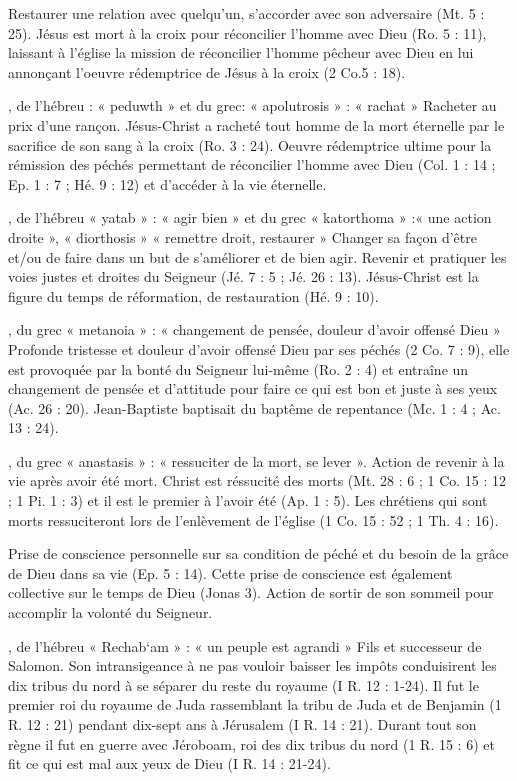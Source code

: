 \begin{multicols}{2}
Restaurer une relation avec quelqu'un, s'accorder avec son adversaire (Mt. 5 : 25). Jésus est mort à la croix pour réconcilier l'homme avec Dieu (Ro. 5 : 11), laissant à l'église la mission de réconcilier l'homme pêcheur avec Dieu en lui annonçant l'oeuvre rédemptrice de Jésus à la croix (2 Co.5 : 18).


, de l'hébreu : « peduwth » et du grec: « apolutrosis » : « rachat »
Racheter au prix d'une rançon. Jésus-Christ a racheté tout homme de la mort éternelle par le sacrifice de son sang à la croix (Ro. 3 : 24). Oeuvre rédemptrice ultime pour la rémission des péchés permettant de réconcilier l'homme avec Dieu (Col. 1 : 14 ; Ep. 1 : 7 ; Hé. 9 : 12) et d'accéder à la vie éternelle.


, de l'hébreu « yatab » : « agir bien » et du grec « katorthoma » :« une action droite », « diorthosis » « remettre droit, restaurer »
Changer sa façon d'être et/ou de faire dans un but de s'améliorer et de bien agir. Revenir et pratiquer les voies justes et droites du Seigneur (Jé. 7 : 5 ; Jé. 26 : 13). Jésus-Christ est la figure du temps de réformation, de restauration (Hé. 9 : 10).


, du grec « metanoia » : « changement de pensée, douleur d'avoir offensé Dieu »
Profonde tristesse et douleur d'avoir offensé Dieu par ses péchés (2 Co. 7 : 9), elle est provoquée par la bonté du Seigneur lui-même (Ro. 2 : 4) et entraîne un changement de pensée et d'attitude pour faire ce qui est bon et juste à ses yeux (Ac. 26 : 20). Jean-Baptiste baptisait du baptême de repentance (Mc. 1 : 4 ; Ac. 13 : 24).


, du grec « anastasis » : « ressuciter de la mort, se lever ».
Action de revenir à la vie après avoir été mort. Christ est réssucité des morts (Mt. 28 : 6 ; 1 Co. 15 : 12 ; 1 Pi. 1 : 3) et il est le premier à l'avoir été (Ap. 1 : 5). Les chrétiens qui sont morts ressuciteront lors de l'enlèvement de l'église (1 Co. 15 : 52 ; 1 Th. 4 : 16).


Prise de conscience personnelle sur sa condition de péché et du besoin de la grâce de Dieu dans sa vie (Ep. 5 : 14). Cette prise de conscience est également collective sur le temps de Dieu (Jonas 3). Action de sortir de son sommeil pour accomplir la volonté du Seigneur.


, de l'hébreu « Rechab`am » : « un peuple est agrandi »
Fils et successeur de Salomon. Son intransigeance à ne pas vouloir baisser les impôts conduisirent les dix tribus du nord à se séparer du reste du royaume (I R. 12 : 1-24). Il fut le premier roi du royaume de Juda rassemblant la tribu de Juda et de Benjamin (1 R. 12 : 21) pendant dix-sept ans à Jérusalem (I R. 14 : 21). Durant tout son règne il fut en guerre avec Jéroboam, roi des dix tribus du nord (1 R. 15 : 6) et fit ce qui est mal aux yeux de Dieu (I R. 14 : 21-24).



\end{multicols}
